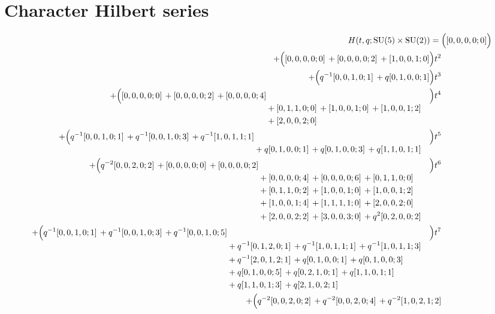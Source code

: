 \documentclass[10pt]{article}
\begin{document}
\section{Character Hilbert series}
\[
\begin{aligned}
H(t,q;\mathrm{SU}(5)\times\mathrm{SU}(2)) ={}&
   \Bigl([0,0,0,0;0]\Bigr) \\
  + \Bigl([0,0,0,0;0]\,+[0,0,0,0;2]\,+[1,0,0,1;0]\Bigr)t^{2} \\
  + \Bigl(q^{-1}[0,0,1,0;1]\,+q[0,1,0,0;1]\Bigr)t^{3} \\
  + \Bigl(\begin{aligned}[t][0,0,0,0;0]\,+[0,0,0,0;2]\,+[0,0,0,0;4] \\
  &{}+[0,1,1,0;0]\,+[1,0,0,1;0]\,+[1,0,0,1;2] \\
  &{}+[2,0,0,2;0]\end{aligned}\Bigr)t^{4} \\
  + \Bigl(\begin{aligned}[t]q^{-1}[0,0,1,0;1]\,+q^{-1}[0,0,1,0;3]\,+q^{-1}[1,0,1,1;1] \\
  &{}+q[0,1,0,0;1]\,+q[0,1,0,0;3]\,+q[1,1,0,1;1]\end{aligned}\Bigr)t^{5} \\
  + \Bigl(\begin{aligned}[t]q^{-2}[0,0,2,0;2]\,+[0,0,0,0;0]\,+[0,0,0,0;2] \\
  &{}+[0,0,0,0;4]\,+[0,0,0,0;6]\,+[0,1,1,0;0] \\
  &{}+[0,1,1,0;2]\,+[1,0,0,1;0]\,+[1,0,0,1;2] \\
  &{}+[1,0,0,1;4]\,+[1,1,1,1;0]\,+[2,0,0,2;0] \\
  &{}+[2,0,0,2;2]\,+[3,0,0,3;0]\,+q^{2}[0,2,0,0;2]\end{aligned}\Bigr)t^{6} \\
  + \Bigl(\begin{aligned}[t]q^{-1}[0,0,1,0;1]\,+q^{-1}[0,0,1,0;3]\,+q^{-1}[0,0,1,0;5] \\
  &{}+q^{-1}[0,1,2,0;1]\,+q^{-1}[1,0,1,1;1]\,+q^{-1}[1,0,1,1;3] \\
  &{}+q^{-1}[2,0,1,2;1]\,+q[0,1,0,0;1]\,+q[0,1,0,0;3] \\
  &{}+q[0,1,0,0;5]\,+q[0,2,1,0;1]\,+q[1,1,0,1;1] \\
  &{}+q[1,1,0,1;3]\,+q[2,1,0,2;1]\end{aligned}\Bigr)t^{7} \\
  + \Bigl(\begin{aligned}[t]q^{-2}[0,0,2,0;2]\,+q^{-2}[0,0,2,0;4]\,+q^{-2}[1,0,2,1;2] \\

\end{aligned}
\end{aligned}\]
\end{document}
